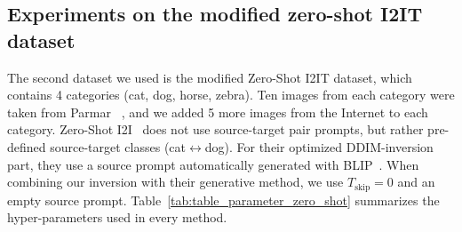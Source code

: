 \clearpage

\subsection{Experiments on the modified zero-shot I2IT dataset}\label{app:zero-shot-dataset}
The second dataset we used is the modified Zero-Shot I2IT dataset, which contains 4 categories (cat, dog, horse, zebra). Ten images from each category were taken from Parmar \etal~\cite{Parmar23}, and we added 5 more images from the Internet to each category. Zero-Shot I2I~\cite{Parmar23} does not use source-target pair prompts, but rather pre-defined source-target classes (\eg cat$\leftrightarrow$dog). For their optimized DDIM-inversion part, they use a source prompt automatically generated with BLIP~\cite{Junnan22}. When combining our inversion with their generative method, we use $T_{\text{skip}}=0$ and an empty source prompt. Table~\ref{tab:table_parameter_zero_shot} summarizes the hyper-parameters used in every method.


